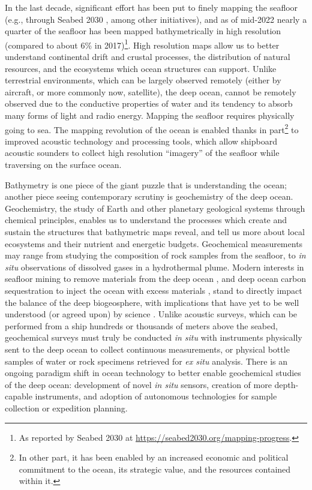 In the last decade, significant effort has been put to finely mapping the seafloor (e.g., through Seabed 2030 \autocite{mayer2018nippon}, among other initiatives), and as of mid-2022 nearly a quarter of the seafloor has been mapped bathymetrically in high resolution (compared to about 6\% in 2017)\footnote{As reported by Seabed 2030 at \url{https://seabed2030.org/mapping-progress}.}. 
High resolution maps allow us to better understand continental drift and crustal processes, the distribution of natural resources, and the ecosystems which ocean structures can support.
Unlike terrestrial environments, which can be largely observed remotely (either by aircraft, or more commonly now, satellite), the deep ocean, cannot be remotely observed due to the conductive properties of water and its tendency to absorb many forms of light and radio energy.
Mapping the seafloor requires physically going to sea.
The mapping revolution of the ocean is enabled thanks in part\footnote{In other part, it has been enabled by an increased economic and political commitment to the ocean, its strategic value, and the resources contained within it.} to improved acoustic technology and processing tools, which allow shipboard acoustic sounders to collect high resolution ``imagery'' of the seafloor while traversing on the surface ocean.

Bathymetry is one piece of the giant puzzle that is understanding the ocean; another piece seeing contemporary scrutiny is geochemistry of the deep ocean.
Geochemistry, the study of Earth and other planetary geological systems through chemical principles, enables us to understand the processes which create and sustain the structures that bathymetric maps reveal, and tell us more about local ecosystems and their nutrient and energetic budgets. 
Geochemical measurements may range from studying the composition of rock samples from the seafloor, to \emph{in situ} observations of dissolved gases in a hydrothermal plume.
Modern interests in seafloor mining to remove materials from the deep ocean \autocite{thompson2018seabed}, and deep ocean carbon sequestration to inject the ocean with excess materials \autocite{teng2018long}, stand to directly impact the balance of the deep biogeosphere, with implications that have yet to be well understood (or agreed upon) by science \autocite{smith2020deep,seibel2001potential,fleeger2010response,sharma2015environmental,childs2020extraction,van2011tighten}.
Unlike acoustic surveys, which can be performed from a ship hundreds or thousands of meters above the seabed, geochemical surveys must truly be conducted \emph{in situ} with instruments physically sent to the deep ocean to collect continuous measurements, or physical bottle samples of water or rock specimens retrieved for \emph{ex situ} analysis.
There is an ongoing paradigm shift in ocean technology to better enable geochemical studies of the deep ocean: development of novel \emph{in situ} sensors, creation of more depth-capable instruments, and adoption of autonomous technologies for sample collection or expedition planning. 

